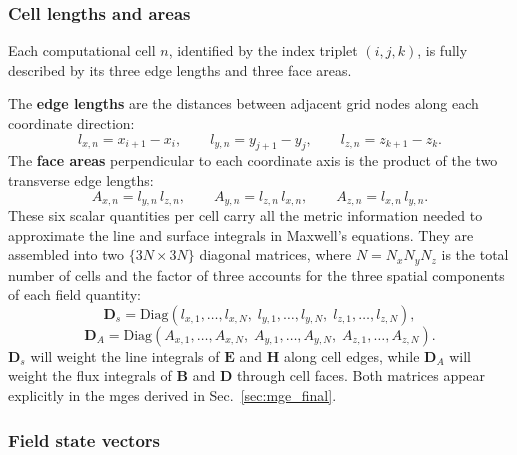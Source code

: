 \subsubsection{Cell lengths and areas}

Each computational cell $n$, identified by the index triplet $(i,j,k)$, is fully described by its three edge lengths and three face areas. 

The \textbf{edge lengths} are the distances between adjacent grid nodes along each coordinate direction:
%
\begin{equation}
l_{x,n} = x_{i+1} - x_i, \qquad l_{y,n} = y_{j+1} - y_j, \qquad l_{z,n} = z_{k+1} - z_k.
\label{eq:edge_lengths}
\end{equation}
%
The \textbf{face areas} perpendicular to each coordinate axis is the product of the two transverse edge lengths:
%
\begin{equation}
A_{x,n} = l_{y,n}\,l_{z,n}, \qquad A_{y,n} = l_{z,n}\,l_{x,n}, \qquad A_{z,n} = l_{x,n}\,l_{y,n}.
\label{eq:face_areas}
\end{equation}
%
These six scalar quantities per cell carry all the metric information needed to approximate the line and surface integrals in Maxwell's equations. They are assembled into two $\{3N \times 3N\}$ diagonal matrices, where $N = N_x N_y N_z$ is the total number of cells and the factor of three accounts for the three spatial components of each field quantity:
%
\begin{equation}
\mathbf{D}_s = \mathrm{Diag}
\!\left(l_{x,1},\ldots,l_{x,N},\;
l_{y,1},\ldots,l_{y,N},\; l_{z,1},\ldots,l_{z,N}\right),
\label{eq:Ds}
\end{equation}
\begin{equation}
\mathbf{D}_A = \mathrm{Diag}
\!\left(A_{x,1},\ldots,A_{x,N},\;
A_{y,1},\ldots,A_{y,N},\; A_{z,1},\ldots,A_{z,N}\right).
\label{eq:Da}
\end{equation}
%
$\mathbf{D}_s$ will weight the line integrals of $\mathbf{E}$ and $\mathbf{H}$ along cell edges, while $\mathbf{D}_A$ will weight the flux integrals of $\mathbf{B}$ and $\mathbf{D}$ through cell faces. Both matrices appear explicitly in the \glspl{mge} derived in Sec.~\ref{sec:mge_final}.

\subsubsection{Field state vectors}

